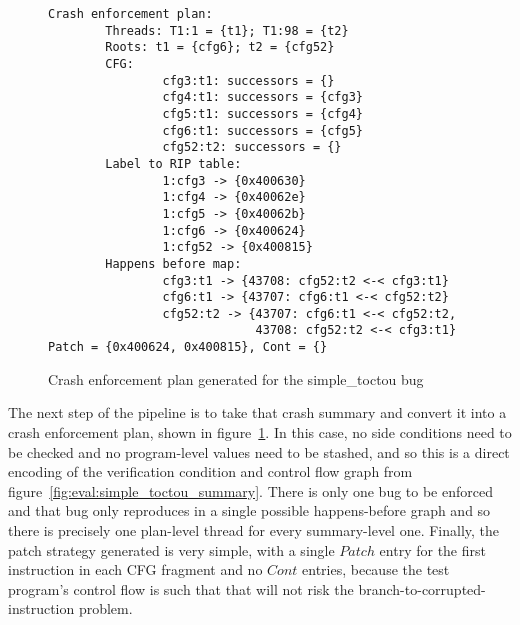 \begin{figure}
  \begin{minipage}{100mm}
\begin{verbatim}
Crash enforcement plan:
        Threads: T1:1 = {t1}; T1:98 = {t2}
        Roots: t1 = {cfg6}; t2 = {cfg52}
        CFG:
                cfg3:t1: successors = {}
                cfg4:t1: successors = {cfg3}
                cfg5:t1: successors = {cfg4}
                cfg6:t1: successors = {cfg5}
                cfg52:t2: successors = {}
        Label to RIP table:
                1:cfg3 -> {0x400630}
                1:cfg4 -> {0x40062e}
                1:cfg5 -> {0x40062b}
                1:cfg6 -> {0x400624}
                1:cfg52 -> {0x400815}
        Happens before map:
                cfg3:t1 -> {43708: cfg52:t2 <-< cfg3:t1}
                cfg6:t1 -> {43707: cfg6:t1 <-< cfg52:t2}
                cfg52:t2 -> {43707: cfg6:t1 <-< cfg52:t2,
                             43708: cfg52:t2 <-< cfg3:t1}
Patch = {0x400624, 0x400815}, Cont = {}
\end{verbatim}
  \end{minipage}
  \caption{Crash enforcement plan generated for the simple\_toctou
    bug} 
  \label{fig:eval:simple_toctou_cep}
\end{figure}

The next step of the pipeline is to take that crash summary and
convert it into a crash enforcement plan, shown in
figure~\ref{fig:eval:simple_toctou_cep}.  In this case, no side
conditions need to be checked and no program-level values need to be
stashed, and so this is a direct encoding of the verification
condition and control flow graph from
figure~\ref{fig:eval:simple_toctou_summary}.  There is only one bug to
be enforced and that bug only reproduces in a single possible
happens-before graph and so there is precisely one plan-level thread
for every summary-level one.  Finally, the patch strategy generated is
very simple, with a single $Patch$ entry for the first instruction in
each CFG fragment and no $Cont$ entries, because the test program's
control flow is such that that will not risk the
branch-to-corrupted-instruction problem.


